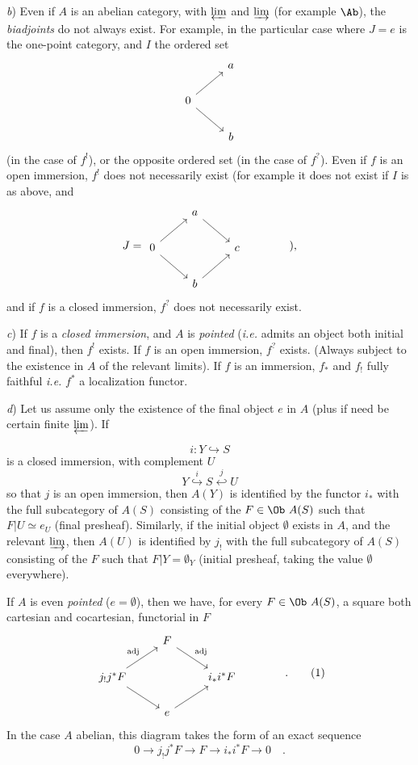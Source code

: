 \textit{b}) Even if $A$ is an abelian category, with $\varprojlim$ and $\varinjlim$ (for example $\Ab$), the \textit{biadjoints} do not always exist. For example, in the particular case where $J=e$ is the one-point category, and $I$ the ordered set
\[
\begin{tikzcd}
 & a \\
0 \arrow[ur] \arrow[dr] & \\
 & b
\end{tikzcd}
\]
(in the case of $f^{!}$), or the opposite ordered set (in the case of $f^{?}$). Even if $f$ is an open immersion, $f^{!}$ does not necessarily exist (for example it does not exist if $I$ is as above, and
\[
J=\begin{tikzcd}
 & a \arrow[dr] & \\
0 \arrow[ur] \arrow[dr] & & c \\
 & b \arrow[ur] &
\end{tikzcd}
\qquad\qquad \text{),}
\]
and if $f$ is a closed immersion, $f^{?}$ does not necessarily exist.

\textit{c}) If $f$ is a \textit{closed immersion}, and $A$ is \textit{pointed} (\textit{i.e.} admits an object both initial and final), then $f^{!}$ exists. If $f$ is an open immersion, $f^{?}$ exists. (Always subject
to the existence in $A$ of the relevant limits). If $f$ is an immersion, $f_{*}$ and $f_{!}$ fully faithful \textit{i.e.} $f^{*}$ a localization functor.

\textit{d}) Let us assume only the existence of the final object $e$ in $A$ (plus if need be certain finite $\varprojlim$). If

\[
i : Y \hookrightarrow S
\]
is a closed immersion, with complement $U$
\[
Y \overset{i}{\hookrightarrow} S \overset{j}{\hookleftarrow} U
\]
so that $j$ is an open immersion, then $A(Y)$ is identified by the functor $i_{*}$ with the full subcategory of $A(S)$ consisting of the $F \in \Ob\ A(S)$ such that $F|U \simeq e_{U}$ (final presheaf). Similarly, if the initial object $\emptyset$ exists in $A$, and the relevant $\varinjlim$, then $A(U)$ is identified by $j_{!}$ with the full subcategory of $A(S)$ consisting of the $F$ such that $F|Y=\emptyset_{Y}$ (initial presheaf, taking the value $\emptyset$ everywhere).

If $A$ is even \textit{pointed} ($e=\emptyset$), then we have, for every $F\in \Ob\ A(S)$, a square both cartesian and cocartesian, functorial in $F$
\[
\begin{tikzcd}
 & F \arrow[dr, "\text{adj}"] & \\
j_{!}j^{*}F \arrow[ur, "\text{adj}"] \arrow[dr] & & i_{*}i^{*}F \\
 & e \arrow[ur] &
\end{tikzcd}
\qquad\qquad \text{.}
\tag*{(1)}
\]
In the case $A$ abelian, this diagram takes the form of an exact sequence
\[
0 \longrightarrow j_{!}j^{*}F \longrightarrow F \longrightarrow i_{*}i^{*}F \longrightarrow 0 \quad .
\]

